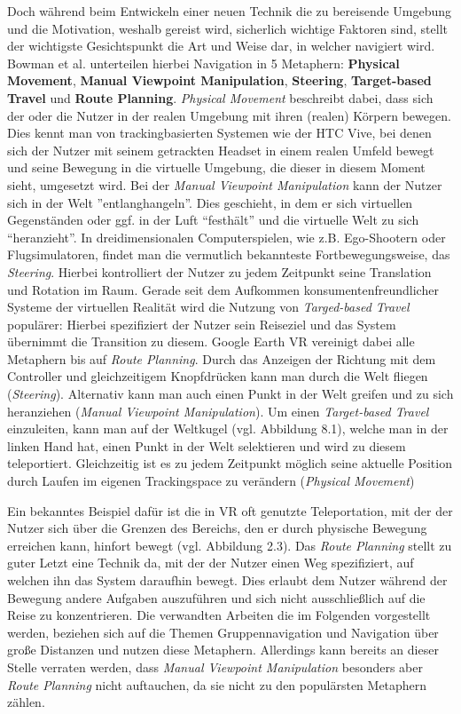 Doch während beim Entwickeln einer neuen Technik die zu bereisende Umgebung und die Motivation, weshalb gereist wird, sicherlich wichtige Faktoren sind, stellt der wichtigste Gesichtspunkt die Art und Weise dar, in welcher navigiert wird. Bowman et al. \cite{Bowman2001AnDesign} unterteilen hierbei Navigation in 5 Metaphern: \textbf{Physical Movement}, \textbf{Manual Viewpoint Manipulation}, \textbf{Steering}, \textbf{Target-based Travel} und \textbf{Route Planning}. 
\textit{Physical Movement} beschreibt dabei, dass sich der oder die Nutzer in der realen Umgebung mit ihren (realen) Körpern bewegen. Dies kennt man von trackingbasierten Systemen wie der HTC Vive, bei denen sich der Nutzer mit seinem getrackten Headset in einem realen Umfeld bewegt und seine Bewegung in die virtuelle Umgebung, die dieser in diesem Moment sieht, umgesetzt wird.
Bei der \textit{Manual Viewpoint Manipulation} kann der Nutzer sich in der Welt ”entlanghangeln”. Dies geschieht, in dem er sich virtuellen Gegenständen oder ggf. in der Luft “festhält” und die virtuelle Welt zu sich “heranzieht”. 
In dreidimensionalen Computerspielen, wie z.B. Ego-Shootern oder Flugsimulatoren, findet man die vermutlich bekannteste Fortbewegungsweise, das \textit{Steering}. Hierbei kontrolliert der Nutzer zu jedem Zeitpunkt seine Translation und Rotation im Raum.
Gerade seit dem Aufkommen konsumentenfreundlicher Systeme der virtuellen Realität wird die Nutzung von \textit{Targed-based Travel} populärer: Hierbei spezifiziert der Nutzer sein Reiseziel und das System übernimmt die Transition zu diesem. 
Google Earth VR vereinigt dabei alle Metaphern bis auf \textit{Route Planning}. Durch das Anzeigen der Richtung mit dem Controller und gleichzeitigem Knopfdrücken kann man durch die Welt fliegen (\textit{Steering}). Alternativ kann man auch einen Punkt in der Welt greifen und zu sich heranziehen (\textit{Manual Viewpoint Manipulation}). Um einen \textit{Target-based Travel} einzuleiten, kann man auf der Weltkugel (vgl. Abbildung 8.1), welche man in der linken Hand hat, einen Punkt in der Welt selektieren und wird zu diesem teleportiert. Gleichzeitig ist es zu jedem Zeitpunkt möglich seine aktuelle Position durch Laufen im eigenen Trackingspace zu verändern (\textit{Physical Movement}) 

Ein bekanntes Beispiel dafür ist die in VR oft genutzte Teleportation, mit der der Nutzer sich über die Grenzen des Bereichs, den er durch physische Bewegung erreichen kann, hinfort bewegt (vgl. Abbildung 2.3).
Das \textit{Route Planning} stellt zu guter Letzt eine Technik da, mit der der Nutzer einen Weg spezifiziert, auf welchen ihn das System daraufhin bewegt. Dies erlaubt dem Nutzer während der Bewegung andere Aufgaben auszuführen und sich nicht ausschließlich auf die Reise zu konzentrieren. Die verwandten Arbeiten die im Folgenden vorgestellt werden, beziehen sich auf die Themen Gruppennavigation und Navigation über große Distanzen und nutzen diese Metaphern. Allerdings kann bereits an dieser Stelle verraten werden, dass \textit{Manual Viewpoint Manipulation} besonders aber \textit{Route Planning} nicht auftauchen, da sie nicht zu den populärsten Metaphern zählen.

